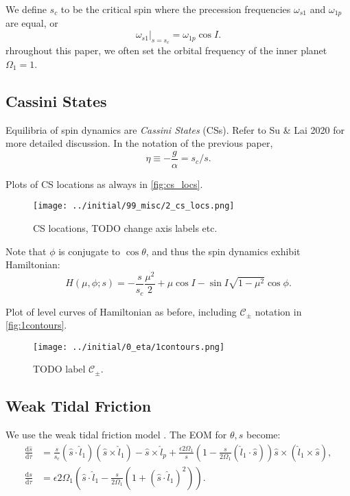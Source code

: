 \documentclass[twocolumn]{aastex63}
\newcommand*{\rd}[2]{\frac{\mathrm{d}#1}{\mathrm{d}#2}}
\newcommand*{\at}[1]{\left.#1\right|}
\newcommand*{\p}[1]{\left(#1\right)}
\begin{document}
We define $s_c$ to be the critical spin where the precession frequencies
$\omega_{s1}$ and $\omega_{1p}$ are equal, or
\begin{equation}
    \at{\omega_{s1}}_{s = s_c} = \omega_{1p}\cos I.
\end{equation}
rhroughout this paper, we often set the orbital frequency of the inner planet
$\Omega_1 = 1$.

\subsection{Cassini States}\label{ss:cs_theory}

Equilibria of spin dynamics are \emph{Cassini States} (CSs). Refer to Su \& Lai
2020 for more detailed discussion. In the notation of the previous paper,
\begin{equation}
    \eta \equiv -\frac{g}{\alpha} = s_c / s.
\end{equation}

Plots of CS locations as always in \autoref{fig:cs_locs}.
\begin{figure}
    \centering
    \texttt{[image: ../initial/99\_misc/2\_cs\_locs.png]}
    \caption{CS locations, TODO change axis labels etc.}\label{fig:cs_locs}
\end{figure}

Note that $\phi$ is conjugate to $\cos \theta$, and thus the spin dynamics
exhibit Hamiltonian:
\begin{equation}
    H(\mu, \phi; s) = -\frac{s}{s_c}\frac{\mu^2}{2}
        + \mu \cos I - \sin I \sqrt{1 - \mu^2}\cos \phi.
\end{equation}

Plot of level curves of Hamiltonian as before, including $\mathcal{C}_{\pm}$
notation in \autoref{fig:1contours}.
\begin{figure}
    \centering
    \texttt{[image: ../initial/0\_eta/1contours.png]}
    \caption{TODO label $\mathcal{C}_{\pm}$.}\label{fig:1contours}
\end{figure}

\subsection{Weak Tidal Friction}\label{ss:weak_tides}

We use the weak tidal friction model \citep{lai2012}. The EOM for $\theta, s$
become:
\begin{align}
    \rd{\hat{s}}{\tau}
        &= \frac{s}{s_c}\p{\hat{s} \cdot \hat{l}_1}\p{\hat{s} \times
                \hat{l}_1} - \hat{s} \times \hat{l}_p
            + \frac{\epsilon 2\Omega_1}{s}
                \p{1 - \frac{s}{2\Omega_1}\p{\hat{l}_1 \cdot \hat{s}}}
                    \hat{s} \times \p{\hat{l}_1 \times \hat{s}},\\
    \rd{s}{\tau}
        &= \epsilon 2\Omega_1 \p{\hat{s} \cdot \hat{l}_1 -
            \frac{s}{2\Omega_1}\p{1 + \p{\hat{s} \cdot \hat{l}_1}^2}}.
\end{align}
\end{document}
